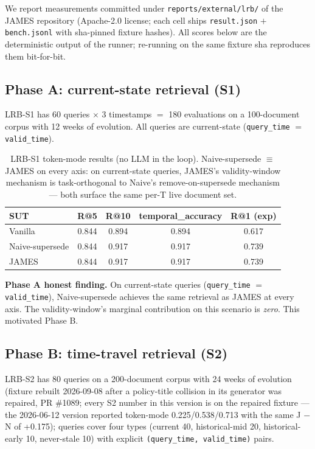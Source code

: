 \documentclass[11pt,a4paper]{article}
\begin{document}
We report measurements committed under \texttt{reports/external/lrb/} of the JAMES repository (Apache-2.0 license; each cell ships \texttt{result.json} $+$ \texttt{bench.jsonl} with sha-pinned fixture hashes). All scores below are the deterministic output of the runner; re-running on the same fixture sha reproduces them bit-for-bit.

\subsection{Phase A: current-state retrieval (S1)}
\label{sec:phase_a}

LRB-S1 has 60 queries $\times$ 3 timestamps $=$ 180 evaluations on a 100-document corpus with 12 weeks of evolution. All queries are current-state (\texttt{query\_time} $=$ \texttt{valid\_time}).

\begin{table}[h]
\centering
\caption{LRB-S1 token-mode results (no LLM in the loop). Naive-supersede $\equiv$ JAMES on every axis: on current-state queries, JAMES's validity-window mechanism is task-orthogonal to Naive's remove-on-supersede mechanism --- both surface the same per-T live document set.}
\label{tab:phase_a}
\begin{tabular}{l c c c c}
\toprule
\textbf{SUT} & \textbf{R@5} & \textbf{R@10} & \textbf{temporal\_accuracy} & \textbf{R@1 (exp)} \\
\midrule
Vanilla & 0.844 & 0.894 & 0.894 & 0.617 \\
Naive-supersede & 0.844 & 0.917 & 0.917 & 0.739 \\
JAMES & 0.844 & 0.917 & 0.917 & 0.739 \\
\bottomrule
\end{tabular}
\end{table}

\textbf{Phase A honest finding.} On current-state queries (\texttt{query\_time} $=$ \texttt{valid\_time}), Naive-supersede achieves the same retrieval as JAMES at every axis. The validity-window's marginal contribution on this scenario is \emph{zero}. This motivated Phase B.

\subsection{Phase B: time-travel retrieval (S2)}
\label{sec:phase_b}

LRB-S2 has 80 queries on a 200-document corpus with 24 weeks of evolution (fixture rebuilt 2026-09-08 after a policy-title collision in its generator was repaired, PR \#1089; every S2 number in this version is on the repaired fixture — the 2026-06-12 version reported token-mode 0.225/0.538/0.713 with the same J $-$ N of +0.175); queries cover four types (current 40, historical-mid 20, historical-early 10, never-stale 10) with explicit \texttt{(query\_time, valid\_time)} pairs.
\end{document}
